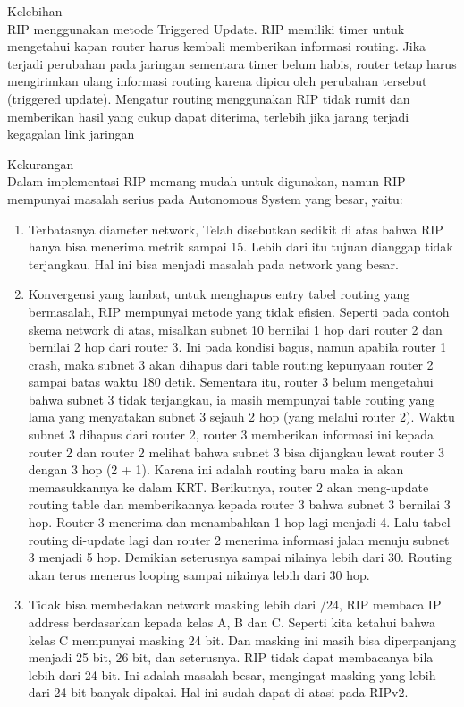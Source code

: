 \documentclass[a4paper,12pt]{article}
\begin{document}
\begin{enumerate}
	{\item Kelebihan\\
	RIP menggunakan metode Triggered Update. RIP memiliki timer untuk mengetahui kapan router harus kembali memberikan informasi routing. Jika terjadi perubahan pada
jaringan sementara timer belum habis, router tetap harus mengirimkan ulang informasi routing karena dipicu oleh perubahan tersebut (triggered update).
Mengatur routing menggunakan RIP tidak rumit dan memberikan hasil yang cukup dapat diterima, terlebih jika jarang terjadi kegagalan link jaringan}
	
	{\item Kekurangan\\
	Dalam implementasi RIP memang mudah untuk digunakan, namun RIP mempunyai masalah serius pada Autonomous System yang besar, yaitu:
	\begin{enumerate}[label=\alph*.]
		\item Terbatasnya diameter network, Telah disebutkan sedikit di atas bahwa RIP hanya bisa menerima metrik sampai 15. Lebih dari itu tujuan dianggap tidak terjangkau. Hal ini bisa menjadi masalah pada network yang besar.
		\item Konvergensi yang lambat, untuk menghapus entry tabel routing yang bermasalah, RIP mempunyai metode yang tidak efisien. Seperti pada contoh skema network di atas, misalkan subnet 10 bernilai 1 hop dari router 2 dan bernilai 2 hop dari router 3. Ini pada kondisi bagus, namun apabila router 1 crash, maka subnet 3 akan dihapus dari table routing kepunyaan router 2 sampai batas waktu 180 detik. Sementara itu, router 3 belum mengetahui bahwa subnet 3 tidak terjangkau, ia masih mempunyai table routing yang lama yang menyatakan subnet 3 sejauh 2 hop (yang melalui router 2). Waktu subnet 3 dihapus dari router 2, router 3 memberikan informasi ini kepada router 2 dan router 2 melihat bahwa subnet 3 bisa dijangkau lewat router 3 dengan 3 hop (2 + 1). Karena ini adalah routing baru maka ia akan memasukkannya ke dalam KRT. Berikutnya, router 2 akan meng-update routing table dan memberikannya kepada router 3 bahwa subnet 3 bernilai 3 hop. Router 3 menerima dan menambahkan 1 hop lagi menjadi 4. Lalu tabel routing di-update lagi dan router 2 menerima informasi jalan menuju subnet 3 menjadi 5 hop. Demikian seterusnya sampai nilainya lebih dari 30. Routing akan terus menerus looping sampai nilainya lebih dari 30 hop.
		\item Tidak bisa membedakan network masking lebih dari /24, RIP membaca IP address berdasarkan kepada kelas A, B dan C. Seperti kita ketahui bahwa kelas C mempunyai masking 24 bit. Dan masking ini masih bisa diperpanjang menjadi 25 bit, 26 bit, dan seterusnya. RIP tidak dapat membacanya bila lebih dari 24 bit. Ini adalah masalah besar,
mengingat masking yang lebih dari 24 bit banyak dipakai. Hal ini sudah dapat di atasi pada RIPv2.\\
	\end{enumerate}}
	
\end{enumerate}
\end{document}
